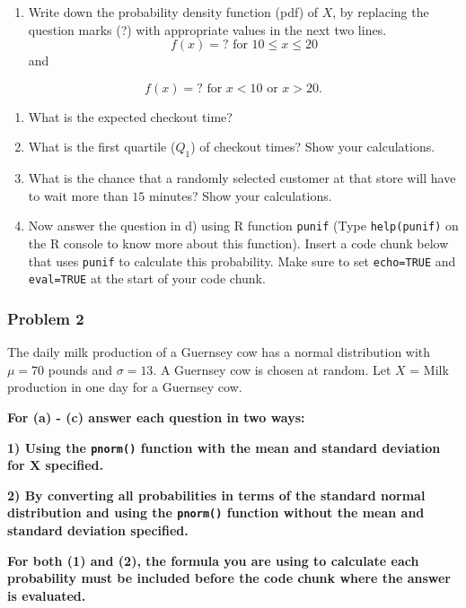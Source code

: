 \documentclass[]{article}
\providecommand{\tightlist}{%
  \setlength{\itemsep}{0pt}\setlength{\parskip}{0pt}}
\begin{document}
\begin{enumerate}
\def\labelenumi{\alph{enumi})}
\tightlist
\item
  Write down the probability density function (pdf) of \(X\), by
  replacing the question marks (?) with appropriate values in the next
  two lines. \[
  f(x) = ? \mbox{ for }  10 \le x \le 20
  \] and
\end{enumerate}

\[
f(x) = ? \mbox{ for } x < 10 \mbox{ or } x > 20.
\]

\begin{enumerate}
\def\labelenumi{\alph{enumi})}
\setcounter{enumi}{1}
\item
  What is the expected checkout time?
\item
  What is the first quartile (\(Q_1\)) of checkout times? Show your
  calculations.
\item
  What is the chance that a randomly selected customer at that store
  will have to wait more than \(15\) minutes? Show your calculations.
\item
  Now answer the question in d) using R function \texttt{punif} (Type
  \texttt{help(punif)} on the R console to know more about this
  function). Insert a code chunk below that uses \texttt{punif} to
  calculate this probability. Make sure to set \texttt{echo=TRUE} and
  \texttt{eval=TRUE} at the start of your code chunk.
\end{enumerate}

\hypertarget{problem-2}{%
\subsubsection{Problem 2}\label{problem-2}}

The daily milk production of a Guernsey cow has a normal distribution
with \(\mu = 70\) pounds and \(\sigma = 13\). A Guernsey cow is chosen
at random. Let \(X\) = Milk production in one day for a Guernsey cow.

\textbf{For (a) - (c) answer each question in two ways:}

\textbf{1) Using the \texttt{pnorm()} function with the mean and
standard deviation for X specified.}

\textbf{2) By converting all probabilities in terms of the standard
normal distribution and using the \texttt{pnorm()} function without the
mean and standard deviation specified.}

\textbf{For both (1) and (2), the formula you are using to calculate
each probability must be included before the code chunk where the answer
is evaluated.}
\end{document}
